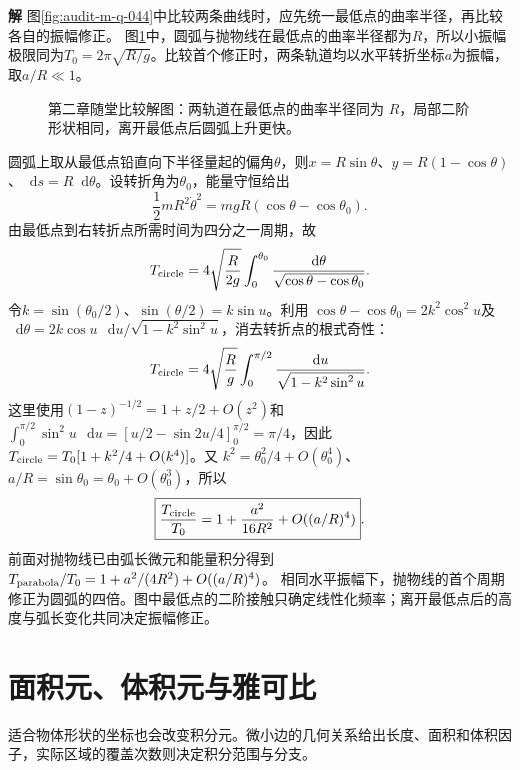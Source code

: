 \documentclass[11pt,openany,fontset=fandol]{ctexbook}
\theoremstyle{plain}\newtheorem{theorem}{定理}[chapter]\newtheorem{proposition}[theorem]{命题}
\theoremstyle{definition}\newtheorem{definition}{定义}[chapter]\newtheorem{example}{例}[chapter]
\theoremstyle{remark}\newtheorem*{remark}{说明}
\newcommand{\SolutionStart}{\par\nobreak\medskip\nobreak\noindent\textbf{解}\quad\ignorespaces}
\newenvironment{solution}{\SolutionStart}{\par\medskip}
\newcommand{\dd}{\mathop{}\!\mathrm d}\newcommand{\ii}{\mathrm i}\newcommand{\ee}{\mathrm e}
\begin{document}

\begin{solution}
图\ref{fig:audit-m-q-044}中比较两条曲线时，应先统一最低点的曲率半径，再比较各自的振幅修正。
图\ref{fig:class-2-3}中，圆弧与抛物线在最低点的曲率半径都为$R$，所以小振幅极限同为$T_0=2\pi\sqrt{R/g}$。比较首个修正时，两条轨道均以水平转折坐标$a$为振幅，取$a/R\ll1$。
\begin{figure}[H]\centering
{}
\caption{第二章随堂比较解图：两轨道在最低点的曲率半径同为 $R$，局部二阶形状相同，离开最低点后圆弧上升更快。}\label{fig:class-2-3}
\end{figure}
圆弧上取从最低点铅直向下半径量起的偏角$\theta$，则$x=R\sin\theta$、$y=R(1-\cos\theta)$、$\dd s=R\dd\theta$。设转折角为$\theta_0$，能量守恒给出
\[
 \frac12mR^2\dot\theta^2=mgR(\cos\theta-\cos\theta_0).
\]
由最低点到右转折点所需时间为四分之一周期，故
\[
 T_{\rm circle}=4\sqrt{\frac{R}{2g}}
 \int_0^{\theta_0}\frac{\dd\theta}{\sqrt{\cos\theta-\cos\theta_0}}.
\]
令$k=\sin(\theta_0/2)$、$\sin(\theta/2)=k\sin u$。利用
$\cos\theta-\cos\theta_0=2k^2\cos^2u$及
$\dd\theta=2k\cos u\,\dd u/\sqrt{1-k^2\sin^2u}$，消去转折点的根式奇性：
\[
 T_{\rm circle}=4\sqrt{\frac Rg}
 \int_0^{\pi/2}\frac{\dd u}{\sqrt{1-k^2\sin^2u}}
 .
\]
这里使用$(1-z)^{-1/2}=1+z/2+O(z^2)$和
$\int_0^{\pi/2}\sin^2u\,\dd u=[u/2-\sin2u/4]_0^{\pi/2}=\pi/4$，因此
$T_{\rm circle}=T_0[1+k^2/4+O(k^4)]$。又
$k^2=\theta_0^2/4+O(\theta_0^4)$、
$a/R=\sin\theta_0=\theta_0+O(\theta_0^3)$，所以
\[
 \boxed{\frac{T_{\rm circle}}{T_0}
 =1+\frac{a^2}{16R^2}+O((a/R)^4)}.
\]
前面对抛物线已由弧长微元和能量积分得到
$T_{\rm parabola}/T_0=1+a^2/(4R^2)+O((a/R)^4)$。
相同水平振幅下，抛物线的首个周期修正为圆弧的四倍。图中最低点的二阶接触只确定线性化频率；离开最低点后的高度与弧长变化共同决定振幅修正。
\end{solution}

\section{面积元、体积元与雅可比}
适合物体形状的坐标也会改变积分元。微小边的几何关系给出长度、面积和体积因子，实际区域的覆盖次数则决定积分范围与分支。
\end{document}
